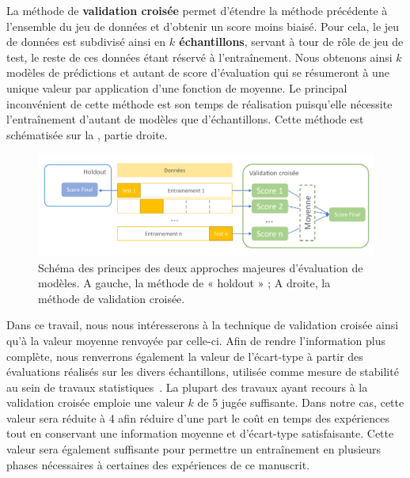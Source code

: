 La méthode de \textbf{validation croisée} permet d'étendre la méthode précédente à l'ensemble du jeu de données et d'obtenir un score moins biaisé. Pour cela, le jeu de données est subdivisé ainsi en \textbf{$k$ échantillons}, servant à tour de rôle de jeu de test, le reste de ces données étant réservé à l'entraînement. Nous obtenons ainsi $k$ modèles de prédictions et autant de score d'évaluation qui se résumeront à une unique valeur par application d'une fonction de moyenne. Le principal inconvénient de cette méthode est son temps de réalisation puisqu'elle nécessite l'entraînement d'autant de modèles que d'échantillons. Cette méthode est schématisée sur la , partie droite.\par

\begin{figure}[H]
    \centering
    \includegraphics[width=\textwidth]{contents/chapter_3/resources/scheme_holdout_cv.pdf}
    \caption{Schéma des principes des deux approches majeures d'évaluation de modèles. A gauche, la méthode de « holdout » ; A droite, la méthode de validation croisée.}
    \label{fig:scheme_holdout_cv}
\end{figure}

Dans ce travail, nous nous intéresserons à la technique de validation croisée ainsi qu'à la valeur moyenne renvoyée par celle-ci. Afin de rendre l'information plus complète, nous renverrons également la valeur de l'écart-type à partir des évaluations réalisés sur les divers échantillons, utilisée comme mesure de stabilité au sein de travaux statistiques~\cite{Kim2009}. La plupart des travaux ayant recours à la validation croisée emploie une valeur $k$ de 5 jugée suffisante. Dans notre cas, cette valeur sera réduite à 4 afin réduire d'une part le coût en temps des expériences tout en conservant une information moyenne et d'écart-type satisfaisante. Cette valeur sera également suffisante pour permettre un entraînement en plusieurs phases nécessaires à certaines des expériences de ce manuscrit.\par

